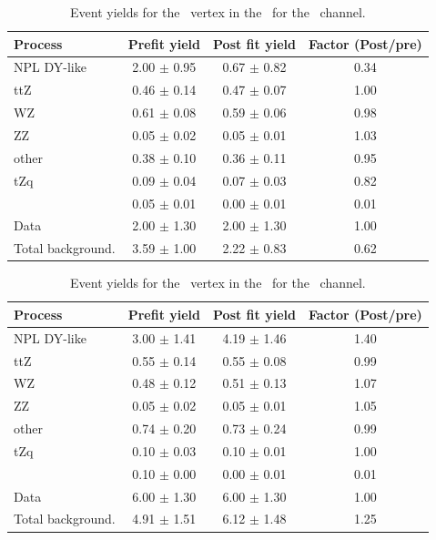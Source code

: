 \begin{table}[htbp]
	\centering
	\caption{Event yields for the \Zct\ vertex in the \TTCR\  for the \eee\ channel. }
	\begin{tabular} {l c c c }
		\toprule
		Process & Prefit yield & Post fit yield & Factor (Post/pre) \\
		\midrule
		NPL DY-like & 2.00 $ \pm $ 0.95 & 0.67 $ \pm $ 0.82 & 0.34 \\ 
		ttZ & 0.46 $ \pm $ 0.14 & 0.47 $ \pm $ 0.07 & 1.00 \\ 
		WZ & 0.61 $ \pm $ 0.08 & 0.59 $ \pm $ 0.06 & 0.98 \\ 
		ZZ & 0.05 $ \pm $ 0.02 & 0.05 $ \pm $ 0.01 & 1.03 \\ 
		other & 0.38 $ \pm $ 0.10 & 0.36 $ \pm $ 0.11 & 0.95 \\ 
		tZq & 0.09 $ \pm $ 0.04 & 0.07 $ \pm $ 0.03 & 0.82 \\ 
		\kZct  & 0.05 $ \pm $ 0.01 & 0.00 $ \pm $ 0.01 & 0.01\\
		\hdashline
		Data & 2.00 $ \pm $ 1.30 & 2.00 $ \pm $ 1.30 & 1.00\\
		Total background. & 3.59 $ \pm $ 1.00 & 2.22 $ \pm $ 0.83 & 0.62\\
		\bottomrule
	\end{tabular}
\end{table}
\begin{table}[htbp]
	\centering
	\caption{Event yields for the \Zct\ vertex in the \TTCR\  for the \eemu\ channel. }
	\begin{tabular} {l c c c }
		\toprule
		Process & Prefit yield & Post fit yield & Factor (Post/pre) \\
		\midrule
		NPL DY-like & 3.00 $ \pm $ 1.41 & 4.19 $ \pm $ 1.46 & 1.40 \\ 
		ttZ & 0.55 $ \pm $ 0.14 & 0.55 $ \pm $ 0.08 & 0.99 \\ 
		WZ & 0.48 $ \pm $ 0.12 & 0.51 $ \pm $ 0.13 & 1.07 \\ 
		ZZ & 0.05 $ \pm $ 0.02 & 0.05 $ \pm $ 0.01 & 1.05 \\ 
		other & 0.74 $ \pm $ 0.20 & 0.73 $ \pm $ 0.24 & 0.99 \\ 
		tZq & 0.10 $ \pm $ 0.03 & 0.10 $ \pm $ 0.01 & 1.00 \\ 
		\kZct  & 0.10 $ \pm $ 0.00 & 0.00 $ \pm $ 0.01 & 0.01\\
		\hdashline
		Data & 6.00 $ \pm $ 1.30 & 6.00 $ \pm $ 1.30 & 1.00\\
		Total background. & 4.91 $ \pm $ 1.51 & 6.12 $ \pm $ 1.48 & 1.25\\
		\bottomrule
	\end{tabular}
\end{table}
